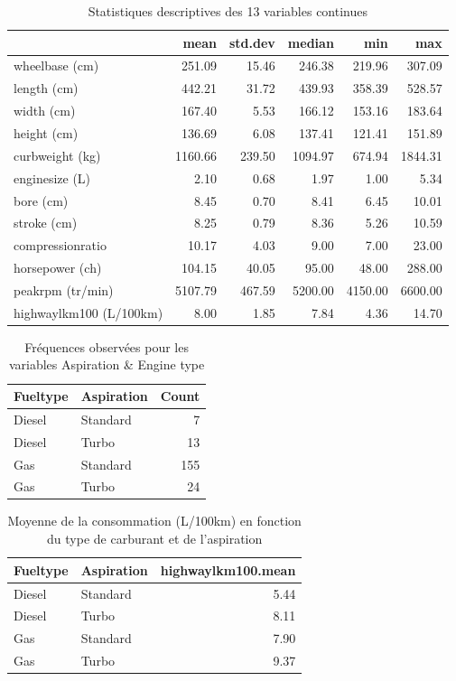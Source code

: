 \documentclass[11pt,a4paper]{article}
\begin{document}
\begin{table}[ht]
	\centering
	\begin{tabular}{lrrrrr}
		\hline
		& mean & std.dev & median & min & max \\ 
		\hline
		wheelbase (cm) & 251.09 & 15.46 & 246.38 & 219.96 & 307.09 \\ 
		length (cm) & 442.21 & 31.72 & 439.93 & 358.39 & 528.57 \\ 
		width (cm) & 167.40 & 5.53 & 166.12 & 153.16 & 183.64 \\ 
		height (cm) & 136.69 & 6.08 & 137.41 & 121.41 & 151.89 \\ 
		curbweight (kg) & 1160.66 & 239.50 & 1094.97 & 674.94 & 1844.31 \\ 
		enginesize (L) & 2.10 & 0.68 & 1.97 & 1.00 & 5.34 \\ 
		bore (cm) & 8.45 & 0.70 & 8.41 & 6.45 & 10.01 \\ 
		stroke (cm) & 8.25 & 0.79 & 8.36 & 5.26 & 10.59 \\ 
		compressionratio & 10.17 & 4.03 & 9.00 & 7.00 & 23.00 \\ 
		horsepower (ch) & 104.15 & 40.05 & 95.00 & 48.00 & 288.00 \\ 
		peakrpm (tr/min) & 5107.79 & 467.59 & 5200.00 & 4150.00 & 6600.00 \\ 
		highwaylkm100 (L/100km) & 8.00 & 1.85 & 7.84 & 4.36 & 14.70 \\ 
		\hline
	\end{tabular}
\caption{Statistiques descriptives des 13 variables continues}
\label{table:desc}
\end{table}

\begin{table}[ht]
	\centering
	\begin{tabular}{llr}
		\hline
		Fueltype	& Aspiration & Count \\
		\hline
		 Diesel & Standard & 7 \\ 
		 Diesel & Turbo & 13 \\ 
		 Gas & Standard & 155 \\ 
		 Gas & Turbo & 24 \\ 
		\hline
	\end{tabular}
\caption{Fréquences observées pour les variables Aspiration \& Engine type}
\label{table:freq}
\end{table}
\begin{table}[ht]
	\centering
	\begin{tabular}{llr}
		\hline
		Fueltype & Aspiration & highwaylkm100.mean \\ 
		\hline
		Diesel & Standard & 5.44 \\ 
		Diesel & Turbo & 8.11 \\ 
		Gas & Standard & 7.90 \\ 
		Gas & Turbo & 9.37 \\ 
		\hline
	\end{tabular}
\caption{Moyenne de la consommation (L/100km) en fonction du type de carburant et de l'aspiration}
\label{table:mean}
\end{table}
\end{document}
